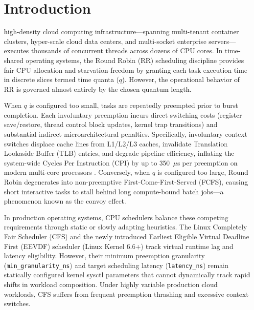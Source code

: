 \documentclass[journal]{IEEEtran}
\begin{document}
\section{Introduction}
 high-density cloud computing infrastructure---spanning multi-tenant container clusters, hyper-scale cloud data centers, and multi-socket enterprise servers---executes thousands of concurrent threads across dozens of CPU cores. In time-shared operating systems, the Round Robin (RR) scheduling discipline provides fair CPU allocation and starvation-freedom by granting each task execution time in discrete slices termed time quanta ($q$). However, the operational behavior of RR is governed almost entirely by the chosen quantum length.

When $q$ is configured too small, tasks are repeatedly preempted prior to burst completion. Each involuntary preemption incurs direct switching costs (register save/restore, thread control block updates, kernel trap transitions) and substantial indirect microarchitectural penalties. Specifically, involuntary context switches displace cache lines from L1/L2/L3 caches, invalidate Translation Lookaside Buffer (TLB) entries, and degrade pipeline efficiency, inflating the system-wide Cycles Per Instruction (CPI) by up to 350~$\mu$s per preemption on modern multi-core processors \cite{hunter2024quantifying, kumar2023hardware}. Conversely, when $q$ is configured too large, Round Robin degenerates into non-preemptive First-Come-First-Served (FCFS), causing short interactive tasks to stall behind long compute-bound batch jobs---a phenomenon known as the convoy effect.

In production operating systems, CPU schedulers balance these competing requirements through static or slowly adapting heuristics. The Linux Completely Fair Scheduler (CFS) and the newly introduced Earliest Eligible Virtual Deadline First (EEVDF) scheduler (Linux Kernel 6.6+) \cite{zijlstra2023eevdf} track virtual runtime lag and latency eligibility. However, their minimum preemption granularity (\texttt{min\_granularity\_ns}) and target scheduling latency (\texttt{latency\_ns}) remain statically configured kernel sysctl parameters that cannot dynamically track rapid shifts in workload composition. Under highly variable production cloud workloads, CFS suffers from frequent preemption thrashing and excessive context switches.
\end{document}
